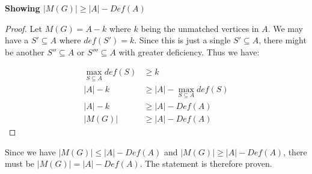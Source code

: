 \documentclass[11pt]{article}
\begin{document}
\textbf{Showing $|M(G)| \geq |A| - Def(A)$}
\begin{proof}
Let $M(G) = A - k$ where $k$ being the unmatched vertices in $A$. We may have a $S' \subseteq A$ where $def(S') = k$. Since this is just a single $S' \subseteq A$, there might be another $S'' \subseteq A$ or $S''' \subseteq A$ with greater deficiency. Thus we have:

\begin{align*}
    \max_{S \subseteq A} def(S) &\geq k \\
    |A| - k &\geq |A| - \max_{S \subseteq A} def(S) \\
    |A| - k &\geq |A| - Def(A) \\
    |M(G)|  &\geq |A| - Def(A)
\end{align*}

\end{proof}

Since we have $|M(G)| \leq |A| - Def(A)$ and $|M(G)| \geq |A| - Def(A)$, there must be $|M(G)| = |A| - Def(A)$. The statement is therefore proven.


%
% 
% 
\end{document}
